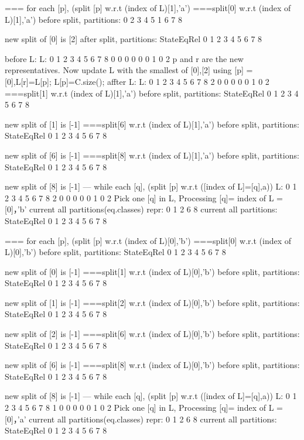 === for each [p], (split [p] w.r.t (index of L)[1],'a')
===split[0] w.r.t (index of L)[1],'a')
before split, partitions:
{ 0  2  3  4  5 }
{ 1 }
{ 6  7 }
{ 8 }

new split of [0] is [2]
after split, partitions:
StateEqRel
{ 0 }
{ 1 }
{ 2  3  4  5 }
{ 6  7 }
{ 8 }

before L:
L:
0 1 2 3 4 5 6 7 8
0 0 0 0 0 0 1 0 2
p and r are the new representatives. Now update L with the smallest of [0],[2]
using [p] = [0],L[r]=L[p]; L[p]=C.size();
affter L:
L:
0 1 2 3 4 5 6 7 8
2 0 0 0 0 0 1 0 2
===split[1] w.r.t (index of L)[1],'a')
before split, partitions:
StateEqRel
{ 0 }
{ 1 }
{ 2  3  4  5 }
{ 6  7 }
{ 8 }

new split of [1] is [-1]
===split[6] w.r.t (index of L)[1],'a')
before split, partitions:
StateEqRel
{ 0 }
{ 1 }
{ 2  3  4  5 }
{ 6  7 }
{ 8 }

new split of [6] is [-1]
===split[8] w.r.t (index of L)[1],'a')
before split, partitions:
StateEqRel
{ 0 }
{ 1 }
{ 2  3  4  5 }
{ 6  7 }
{ 8 }

new split of [8] is [-1]
--- while each [q], (split [p] w.r.t ([index of L]=[q],a))
L:
0 1 2 3 4 5 6 7 8
2 0 0 0 0 0 1 0 2
Pick one [q] in L, Processing [q]= index of L = [0]，'b'
current all partitions(eq.classes) repr:
{ 0  1  2  6  8 }
current all partitions:
StateEqRel
{ 0 }
{ 1 }
{ 2  3  4  5 }
{ 6  7 }
{ 8 }

=== for each [p], (split [p] w.r.t (index of L)[0],'b')
===split[0] w.r.t (index of L)[0],'b')
before split, partitions:
StateEqRel
{ 0 }
{ 1 }
{ 2  3  4  5 }
{ 6  7 }
{ 8 }

new split of [0] is [-1]
===split[1] w.r.t (index of L)[0],'b')
before split, partitions:
StateEqRel
{ 0 }
{ 1 }
{ 2  3  4  5 }
{ 6  7 }
{ 8 }

new split of [1] is [-1]
===split[2] w.r.t (index of L)[0],'b')
before split, partitions:
StateEqRel
{ 0 }
{ 1 }
{ 2  3  4  5 }
{ 6  7 }
{ 8 }

new split of [2] is [-1]
===split[6] w.r.t (index of L)[0],'b')
before split, partitions:
StateEqRel
{ 0 }
{ 1 }
{ 2  3  4  5 }
{ 6  7 }
{ 8 }

new split of [6] is [-1]
===split[8] w.r.t (index of L)[0],'b')
before split, partitions:
StateEqRel
{ 0 }
{ 1 }
{ 2  3  4  5 }
{ 6  7 }
{ 8 }

new split of [8] is [-1]
--- while each [q], (split [p] w.r.t ([index of L]=[q],a))
L:
0 1 2 3 4 5 6 7 8
1 0 0 0 0 0 1 0 2
Pick one [q] in L, Processing [q]= index of L = [0]，'a'
current all partitions(eq.classes) repr:
{ 0  1  2  6  8 }
current all partitions:
StateEqRel
{ 0 }
{ 1 }
{ 2  3  4  5 }
{ 6  7 }
{ 8 }

